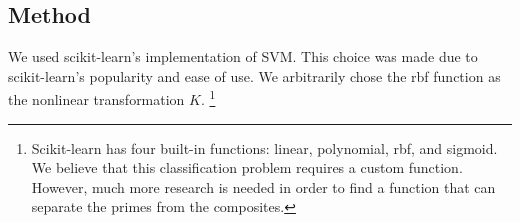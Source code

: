 \documentclass[10pt, titlepage]{amsart}
\theoremstyle{definition}
\newtheorem{definition}{Definition}[subsection]
\newtheorem{example}{Example}[subsection]
\begin{document}
%	
%	
%	
%	
%	
	
	
	
	
	
	
	
	
		
	\subsection{Method}\label{method}
	We used scikit-learn's implementation of SVM.
	This choice was made due to scikit-learn's popularity and ease of use.
	We arbitrarily chose the rbf function as the nonlinear transformation $K$.
	\footnote{
		Scikit-learn has four built-in functions: linear, polynomial, rbf, and sigmoid.	
		We believe that this classification problem requires a custom function.
		However, much more research is needed in order to find a function that can separate the primes from the composites.
	}			
	
\end{document}
